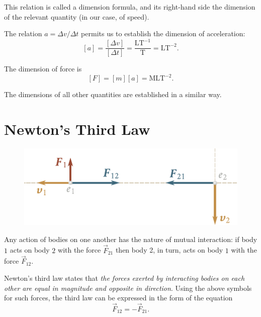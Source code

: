 \noindent
This relation is called a dimension formula, and its right-hand side the dimension of the relevant quantity (in our case, of speed).

The relation $a = \Delta v/\Delta t$ permits us to establish the dimension of acceleration:
\begin{equation}\label{eq:2_15}
[a] = \frac{[\Delta v]}{[\Delta t]} = \frac{\text{LT}^{-1}}{\text{T}} = \text{LT}^{-2}.
\end{equation}

\noindent
The dimension of force is
\begin{equation}\label{eq:2_16}
[F] = [m][a] = \text{MLT}^{-2}.
\end{equation}

\noindent
The dimensions of all other quantities are established in a similar way.

\section{Newton's Third Law}\label{sec:2_6}

\begin{figure}[t]
	\begin{center}
		\includegraphics[scale=1]{figures/ch_02/fig_2_1.pdf}
		\caption[]{}
		\label{fig:2_1}
	\end{center}
	\vspace{-0.7cm}
\end{figure}

Any action of bodies on one another has the nature of mutual interaction: if body $1$ acts on body $2$ with the force $\vec{F}_{21}$ then body 2, in turn, acts on body $1$ with the force $\vec{F}_{12}$.

Newton's third law states that \textit{the forces exerted by interacting bodies on each other are equal in magnitude and opposite in direction}. Using the above symbols for such forces, the third law can be expressed in the form of the equation
\begin{equation}\label{eq:2_17}
\vec{F}_{12} = - \vec{F}_{21}.
\end{equation}

